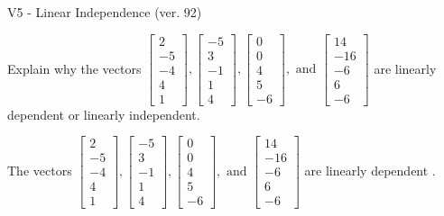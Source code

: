 \begin{exercise}
  \begin{exerciseTitle}V5 - Linear Independence (ver. 92)\end{exerciseTitle}
  \begin{exerciseStatement}
    Explain why the vectors \(\left[\begin{array}{r}
2 \\
-5 \\
-4 \\
4 \\
1
\end{array}\right] , \left[\begin{array}{r}
-5 \\
3 \\
-1 \\
1 \\
4
\end{array}\right] , \left[\begin{array}{r}
0 \\
0 \\
4 \\
5 \\
-6
\end{array}\right] , \text{ and } \left[\begin{array}{r}
14 \\
-16 \\
-6 \\
6 \\
-6
\end{array}\right]\) are linearly dependent or linearly independent.	


  \end{exerciseStatement}
  \begin{exerciseAnswer}
   The vectors \(\left[\begin{array}{r}
2 \\
-5 \\
-4 \\
4 \\
1
\end{array}\right] , \left[\begin{array}{r}
-5 \\
3 \\
-1 \\
1 \\
4
\end{array}\right] , \left[\begin{array}{r}
0 \\
0 \\
4 \\
5 \\
-6
\end{array}\right] , \text{ and } \left[\begin{array}{r}
14 \\
-16 \\
-6 \\
6 \\
-6
\end{array}\right]\) are 
  	 linearly dependent  .
  


  \end{exerciseAnswer}
\end{exercise}